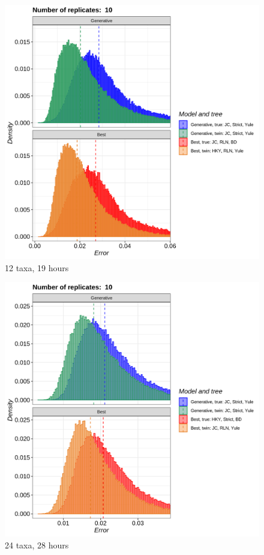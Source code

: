 \begin{figure}[H]
  \includegraphics[width=\textwidth]{pirouette_example_32/errors.png}
  \caption{12 taxa, 19 hours}
\end{figure}

\begin{figure}[H]
  \includegraphics[width=\textwidth]{pirouette_example_33/errors.png}
  \caption{24 taxa, 28 hours}
\end{figure}

